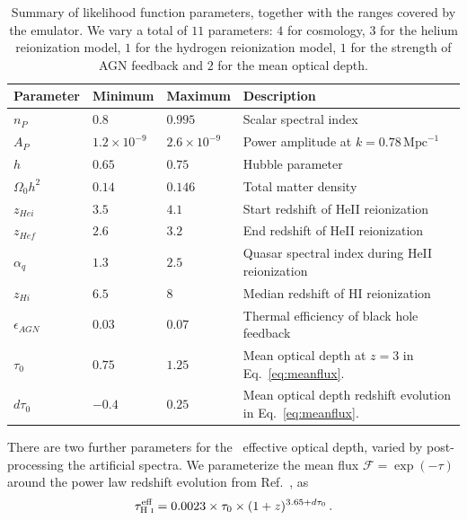 \begin{table}
\begin{centering}
  \begin{tabular}{llll}
  \hline
  Parameter & Minimum & Maximum & Description \\
    \hline
    $n_P$  &  $0.8$  & $0.995$ & Scalar spectral index \\
    $A_P$  &  $1.2 \times 10^{-9}$  & $2.6 \times 10^{-9}$ & Power amplitude at $k = 0.78 \,\mathrm{Mpc}^{-1}$ \\
    $h$    & $0.65$  & $0.75$ & Hubble parameter \\
    $\Omega_0 h^2$ & $0.14$ & $0.146$ & Total matter density \\
    $z_{Hei}$      & $3.5$  & $4.1$  & Start redshift of HeII reionization \\
    $z_{Hef}$      & $2.6$  & $3.2$  & End redshift of HeII reionization \\
    $\alpha_q$     & $1.3$  & $2.5$ & Quasar spectral index during HeII reionization  \\
    $z_{Hi}$        & $6.5$ & $8$   & Median redshift of HI reionization \\
    $\epsilon_{AGN}$ & $0.03$ & $0.07$ & Thermal efficiency of black hole feedback \\
    $\tau_0$ & $0.75$ & $1.25$ & Mean optical depth at $z=3$ in Eq.~\ref{eq:meanflux}.\\
    $d \tau_0$ & $-0.4$ & $0.25$ & Mean optical depth redshift evolution in Eq.~\ref{eq:meanflux}. \\
    \hline
  \end{tabular}
  \caption{Summary of likelihood function parameters, together with the ranges covered by the emulator. We vary a total of $11$ parameters: $4$ for cosmology, $3$ for the helium reionization model, $1$ for the hydrogen reionization model, $1$ for the strength of AGN feedback and $2$ for the mean optical depth.}
  \label{tab:emulatorparams}
  \end{centering}
\end{table}

There are two further parameters for the \Lya~effective optical depth, varied by post-processing the artificial spectra.
We parameterize the mean flux $\mathcal{F} = \exp(-\tau)$ around the power law redshift evolution from Ref.~\cite{2007MNRAS.382.1657K}, as
\begin{equation}
\tau^{\text{eff}}_{\text{H~{\sc i}}} = 0.0023 \times \tau_0 \times (1+z)^{3.65 + d\tau_0}\,.
 \label{eq:meanflux}
\end{equation}

